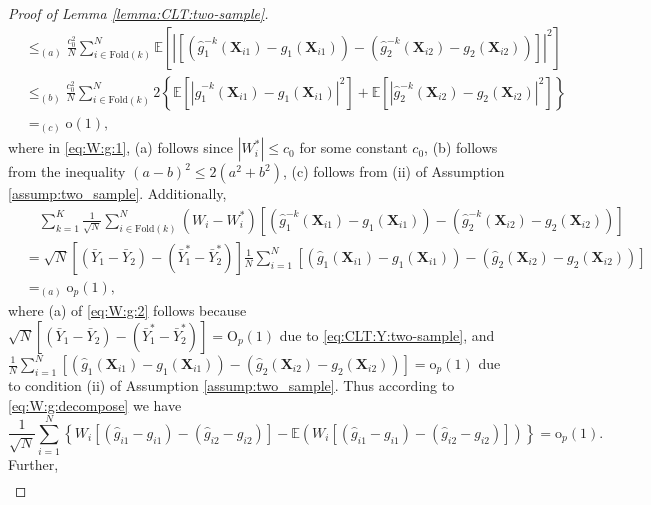 \documentclass[12pt,letterpaper]{article}
\begin{document}
\begin{proof}[Proof of Lemma \ref{lemma:CLT:two-sample}]
\begin{equation}
\begin{array}{rl}
&\displaystyle\leq_{(a)}\frac{c_0^2}{N}\sum_{i\in\textrm{Fold}(k)}^N\mathbb{E}\left[\left|\left[(\hat{g}_{1}^{-k}(\mathbf{X}_{i1})-g_{1}(\mathbf{X}_{i1}))-(\hat{g}_{2}^{-k}(\mathbf{X}_{i2})-g_{2}(\mathbf{X}_{i2}))\right]\right|^2\right]\\
&\displaystyle\leq_{(b)}\frac{c_0^2}{N}\sum_{i\in\textrm{Fold}(k)}^N2\left\{\mathbb{E}\left[|\hat{g}_{1}^{-k}(\mathbf{X}_{i1})-g_{1}(\mathbf{X}_{i1})|^2\right]+\mathbb{E}\left[|\hat{g}_{2}^{-k}(\mathbf{X}_{i2})-g_{2}(\mathbf{X}_{i2})|^2\right]\right\}\\
&=_{(c)}\mathrm{o}(1),
\end{array}
\end{equation}
where in \eqref{eq:W:g:1}, (a) follows since $|W_i^*|\leq c_0$ for some constant $c_0$, (b) follows from the inequality $(a-b)^2\leq 2(a^2+b^2)$, (c) follows from (ii) of Assumption \ref{assump:two_sample}. Additionally, 
\begin{equation}\label{eq:W:g:2}
\begin{array}{rl}
&\displaystyle\quad\sum_{k=1}^K\frac{1}{\sqrt{N}}\sum_{i\in\textrm{Fold}(k)}^N(W_i-W_i^*)[(\hat{g}_{1}^{-k}(\mathbf{X}_{i1})-g_{1}(\mathbf{X}_{i1}))-(\hat{g}_{2}^{-k}(\mathbf{X}_{i2})-g_{2}(\mathbf{X}_{i2}))]\\
&\displaystyle=\sqrt{N}\left[(\bar{Y}_1-\bar{Y}_2)-(\bar{Y}_1^*-\bar{Y}_2^*)\right]\frac{1}{N}\sum_{i=1}^N\left[(\hat{g}_{1}(\mathbf{X}_{i1})-g_{1}(\mathbf{X}_{i1}))-(\hat{g}_{2}(\mathbf{X}_{i2})-g_{2}(\mathbf{X}_{i2}))\right]\\
&=_{(a)}\mathrm{o}_p(1),
\end{array}
\end{equation}
where (a) of \eqref{eq:W:g:2} follows because $\sqrt{N}\left[(\bar{Y}_1-\bar{Y}_2)-(\bar{Y}_1^*-\bar{Y}_2^*)\right]=\mathrm{O}_p(1)$ due to \eqref{eq:CLT:Y:two-sample}, and 
$\displaystyle\frac{1}{N}\sum_{i=1}^N\left[(\hat{g}_{1}(\mathbf{X}_{i1})-g_{1}(\mathbf{X}_{i1}))-(\hat{g}_{2}(\mathbf{X}_{i2})-g_{2}(\mathbf{X}_{i2}))\right]=\mathrm{o}_p(1)$ due to condition (ii) of Assumption \ref{assump:two_sample}. Thus according to \eqref{eq:W:g:decompose} we have 
\begin{equation}\label{eq:W:g:vanish:1}
    \frac{1}{\sqrt{N}}\sum_{i=1}^N\left\{W_i[(\hat{g}_{i1}-g_{i1})-(\hat{g}_{i2}-g_{i2})]-\mathbb{E}\left(W_i[(\hat{g}_{i1}-g_{i1})-(\hat{g}_{i2}-g_{i2})]\right)\right\}=\mathrm{o}_p(1).
\end{equation}
Further, 
\begin{equation}\label{eq:g:w:equiv}
\begin{array}{rl}

\end{array}
\end{equation}
\end{proof}
\end{document}
